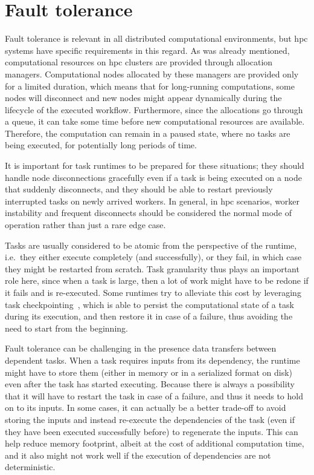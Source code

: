 \section{Fault tolerance}
Fault tolerance is relevant in all distributed computational environments, but
\gls{hpc} systems have specific requirements in this regard. As was already
mentioned, computational resources on \gls{hpc} clusters are provided through
allocation managers. Computational nodes allocated by these managers are provided only for a
limited duration, which means that for long-running computations, some nodes will disconnect and
new nodes might appear dynamically during the lifecycle of the executed workflow. Furthermore,
since the allocations go through a queue, it can take some time before new computational resources
are available. Therefore, the computation can remain in a paused state, where no tasks are being
executed, for potentially long periods of time.

It is important for task runtimes to be prepared for these situations; they should handle node
disconnections gracefully even if a task is being executed on a node that suddenly disconnects, and
they should be able to restart previously interrupted tasks on newly arrived workers. In general,
in \gls{hpc} scenarios, worker instability and frequent disconnects should be
considered the normal mode of operation rather than just a rare edge case.

Tasks are usually considered to be atomic from the perspective of the runtime, i.e.\ they either
execute completely (and successfully), or they fail, in which case they might be restarted from
scratch. Task granularity thus plays an important role here, since when a task is large, then a lot
of work might have to be redone if it fails and is re-executed. Some runtimes try to alleviate this
cost by leveraging task checkpointing~\cite{task_checkpointing}, which is able to persist the
computational state of a task during its execution, and then restore it in case of a failure, thus
avoiding the need to start from the beginning.

Fault tolerance can be challenging in the presence data transfers between dependent tasks. When a
task requires inputs from its dependency, the runtime might have to store them (either in memory or
in a serialized format on disk) even after the task has started executing. Because there is always
a possibility that it will have to restart the task in case of a failure, and thus it needs to hold
on to its inputs. In some cases, it can actually be a better trade-off to avoid storing the inputs
and instead re-execute the dependencies of the task (even if they have been executed successfully
before) to regenerate the inputs. This can help reduce memory footprint, albeit at the cost of
additional computation time, and it also might not work well if the execution of dependencies are
not deterministic.

